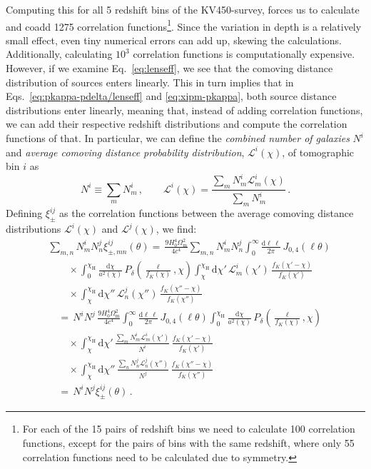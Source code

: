 \documentclass{aa}
\renewcommand{\rm}{\mathrm}
\begin{document}
Computing this for all 5 redshift bins of the KV450-survey, forces us to calculate and coadd 1275 correlation functions\footnote{For each of the 15 pairs of redshift bins we need to calculate 100 correlation functions, except for the pairs of bins with the same redshift, where only 55 correlation functions need to be calculated due to symmetry.}. Since the variation in depth is a relatively small effect, even tiny numerical errors can add up, skewing the calculations. Additionally, calculating $10^3$ correlation functions is computationally expensive. However, if we examine Eq.~\eqref{eq:lenseff}, we see that the comoving distance distribution of sources enters linearly. This in turn implies that in Eqs.~\eqref{eq:pkappa-pdelta/lenseff} and \eqref{eq:xipm-pkappa}, both source distance distributions enter linearly, meaning that, instead of adding correlation functions, we can add their respective redshift distributions and compute the correlation functions of that. In particular, we can define the \textit{combined number of galaxies} $N^i$ and \textit{average comoving distance probability distribution}, $\mathcal{L}^i(\chi)$, of tomographic bin $i$ as \begin{equation}
N^i\equiv\sum_m N_m^i\, , \qquad \mathcal{L}^i(\chi) = \frac{\sum_m N_m^i \mathcal{L}_m^i(\chi)}{\sum_m N_m^i} \, .
\end{equation}
Defining $\xi^{ij}_\pm$ as the correlation functions between the average comoving distance distributions $\mathcal{L}^i(\chi)$ and $\mathcal{L}^j(\chi)$, we find: \begin{align}
& \sum_{m,n}N_m^iN_n^j\xi^{ij}_{\pm,mn}(\theta) = \, \frac{9 H_0^4\Omega_{\rm m}^2}{4c^4} \sum_{m,n} N_m^i N_n^j \int_0^\infty \frac{{\rm d}\ell\,\ell}{2\pi}\, J_{0,4}(\ell\theta) \nonumber\\
& \qquad\times \int_0^{\chi_{\rm{H}}} \frac{{\rm d}\chi}{a^2(\chi)}\, P_\delta\left(\frac{\ell}{f_K(\chi)},\chi\right)
\int_\chi^{\chi_{\rm{H}}} {\rm d}\chi' \, \mathcal{L}^i_m(\chi') \, \frac{f_K(\chi'-\chi)}{f_K(\chi')} \nonumber\\
& \qquad\times \int_\chi^{\chi_{\rm{H}}} {\rm d}\chi'' \, \mathcal{L}^j_n(\chi'') \, \frac{f_K(\chi''-\chi)}{f_K(\chi'')} \nonumber\\
 & \quad =  \,N^i N^j \, \frac{9 H_0^4\Omega_{\rm m}^2}{4c^4} \int_0^\infty \frac{{\rm d}\ell\,\ell}{2\pi}\, J_{0,4}(\ell\theta) \int_0^{\chi_{\rm{H}}} \frac{{\rm d}\chi}{a^2(\chi)}\, P_\delta\left(\frac{\ell}{f_K(\chi)},\chi\right) \nonumber\\
& \qquad\times \int_\chi^{\chi_{\rm{H}}} {\rm d}\chi' \, \frac{\sum_m N_m^i \mathcal{L}^i_m(\chi')}{N^i} \, \frac{f_K(\chi'-\chi)}{f_K(\chi')} \nonumber\\
& \qquad\times \int_\chi^{\chi_{\rm{H}}} {\rm d}\chi'' \, \frac{\sum_n N_n^j \mathcal{L}^j_n(\chi'')}{N^j}  \, \frac{f_K(\chi''-\chi)}{f_K(\chi'')} \nonumber\\
& \quad =  \, N^iN^j\xi^{ij}_\pm(\theta)\, .
\end{align}
\end{document}
